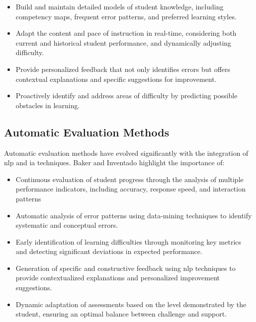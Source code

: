 \begin{itemize}
  \item Build and maintain detailed models of student knowledge, including competency maps, frequent error patterns, and preferred learning styles.

  \item Adapt the content and pace of instruction in real-time, considering both current and historical student performance, and dynamically adjusting difficulty.

  \item Provide personalized feedback that not only identifies errors but offers contextual explanations and specific suggestions for improvement.

  \item Proactively identify and address areas of difficulty by predicting possible obstacles in learning.
\end{itemize}

\subsection{Automatic Evaluation Methods}

Automatic evaluation methods have evolved significantly with the integration of \gls{nlp} and \gls{ia} techniques. Baker and Inventado \cite{baker2014educational} highlight the importance of:

\begin{itemize}
  \item Continuous evaluation of student progress through the analysis of multiple performance indicators, including accuracy, response speed, and interaction patterns

  \item Automatic analysis of error patterns using \gls{data-mining} techniques to identify systematic and conceptual errors.

  \item Early identification of learning difficulties through monitoring key metrics and detecting significant deviations in expected performance.

  \item Generation of specific and constructive feedback using \gls{nlp} techniques to provide contextualized explanations and personalized improvement suggestions.

  \item Dynamic adaptation of assessments based on the level demonstrated by the student, ensuring an optimal balance between challenge and support.
\end{itemize}

